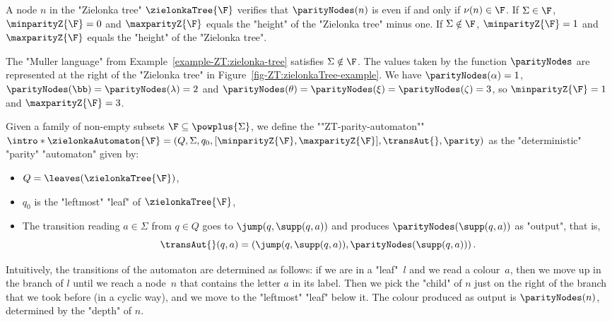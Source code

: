 \documentclass[10pt,a4paper]{amsart}
\renewcommand{\aa}{\alpha}
\renewcommand{\SS}{\Sigma}
\begin{document}
\begin{remark}\label{rmk:parity_levels_ZT}
	A node $n$ in the "Zielonka tree" $\zielonkaTree{\F}$ verifies that $\parityNodes(n)$ is even if and only if $\nu(n)\in \F$.
	If $\SS\in \F$, $\minparityZ{\F} = 0$ and $\maxparityZ{\F}$ equals the "height" of the "Zielonka tree" minus one. If $\SS\notin \F$, $\minparityZ{\F} = 1$ and $\maxparityZ{\F}$ equals the "height" of the "Zielonka tree". 
\end{remark}

\begin{example}
	The "Muller language" from Example~\ref{example-ZT:zielonka-tree} satisfies $\SS\notin \F$. The values taken by the function $\parityNodes$ are represented at the right of the "Zielonka tree" in Figure~\ref{fig-ZT:zielonkaTree-example}. We have $\parityNodes(\aa)=1$, $\parityNodes(\bb)=\parityNodes(\lambda) = 2$ and $\parityNodes(\theta) = \parityNodes(\xi) = \parityNodes(\zeta) = 3$, so $\minparityZ{\F}=1$ and $\maxparityZ{\F}=3$.
\end{example}



\begin{definition}\label{def-ZT:parityAutomatonZT}
	\AP Given a family of non-empty subsets $\F\subseteq \powplus{\SS}$,
	we define the  ""ZT-parity-automaton"" $\intro*\zielonkaAutomaton{\F}=(Q, \SS, q_0, [\minparityZ{\F}, \maxparityZ{\F}], \transAut{}, \parity)$ as the "deterministic" "parity" "automaton" given by:
	\begin{itemize}
		\item $Q=\leaves(\zielonkaTree{\F})$, 
		\item $q_0$ is the "leftmost" "leaf" of $\zielonkaTree{\F}$,\footnotemark{}
		\item The transition reading $a\in\SS$ from $q\in Q$ goes to $\jump(q,\supp(q,a))$  and produces $\parityNodes(\supp(q,a))$ as "output", that is, \[\transAut{}(q,a) = \left(\jump(q,\supp(q,a)), \parityNodes(\supp(q,a))\right).\]
	\end{itemize}
\end{definition}



Intuitively, the transitions of the automaton are determined as follows: if we are in a "leaf"~$l$ and we read a colour~$a$, then we move up in the branch of $l$ until we reach a node~$n$ that contains the letter $a$ in its label. 
Then we pick the "child" of $n$ just on the right of the branch that we took before (in a cyclic way), and we move to the "leftmost" "leaf" below it. The colour produced as output is $\parityNodes(n)$, determined by the "depth" of $n$.
\end{document}
